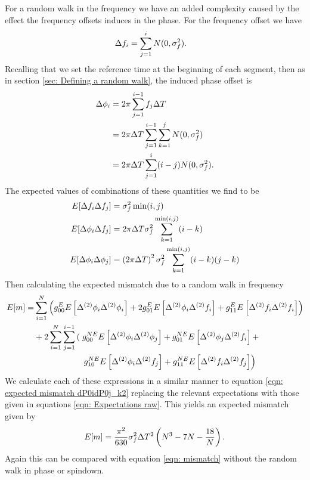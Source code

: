 For a random walk in the frequency we have an added complexity caused by the
effect the frequency offsets induces in the phase. For the frequency offset we 
have
\begin{align}
\Delta f_{i} &= \sum_{j=1}^{i}N(0, \sigma_{f}^{2}).
\end{align}
Recalling that we set the reference time at the beginning of each segment, 
then as in section \ref{sec: Defining a random walk}, the induced phase offset is
\begin{align}
\Delta\phi_{i} &=2\pi \sum_{j=1}^{i-1}f_{j}\Delta T \\
 & = 2\pi\Delta T \sum_{j=1}^{i-1}\sum_{k=1}^{j}N(0, \sigma_{f}^{2}) \\
& = 2\pi\Delta T \sum_{j=1}^{i}(i-j)N(0, \sigma_{f}^{2}).
\end{align}
The expected values of combinations of these quantities we find to be
\begin{align}
E[\Delta f_{i}\Delta f_{j}] & = \sigma_{f}^{2} \min(i, j) \\
E[\Delta\phi_{i}\Delta f_{j}] & = 2 \pi \Delta T \sigma_{f}^{2} \sum_{k=1}^{\min(i, j)}(i-k)\\
E[\Delta\phi_{i}\Delta\phi_{j}] & = 
\left(2\pi\Delta T\right)^{2}\sigma_{f}^{2} \sum_{k=1}^{\min(i, j)}(i-k)(j-k)
\label{eqn: Expectations raw}
\end{align}
Then calculating the expected mismatch due to a random walk in frequency 
\begin{align}
E[m] = & 
\s{i=1}{N}\left(g_{00}^{E}E\left[\Delta^{(2)}\phi_{i}\Delta^{(2)}\phi_{i}\right] 
+ 2 g_{01}^{E}E\left[\Delta^{(2)}\phi_{i}\Delta^{(2)}\f_{i}\right] 
+  g_{11}^{E} E\left[\Delta^{(2)}\f_{i}\Delta^{(2)}\f_{i}\right] \right) \\
& + 2\s{i=1}{N}\s{j=1}{i-1}\left(\right.
g_{00}^{NE}E\left[\Delta^{(2)}\phi_{i}\Delta^{(2)}\phi_{j}\right] + 
g_{01}^{NE}E\left[\Delta^{(2)}\phi_{j}\Delta^{(2)}\f_{i}\right] +  \\ 
&\hspace{20mm}\left. g_{10}^{NE}E\left[\Delta^{(2)}\phi_{i}\Delta^{(2)}\f_{j}\right] + 
g_{11}^{NE} E\left[\Delta^{(2)}\f_{i}\Delta^{(2)}\f_{j}\right] \right)
\end{align}
We calculate each of these expressions in a similar manner to equation
\eqref{eqn: expected mismatch dP0idP0j_k2} replacing the relevant expectations
with those given in equations \eqref{eqn: Expectations raw}. This yields an
expected mismatch given by 
\begin{equation}
E[m] = \frac{\pi^{2} }{630} \sigma_{f}^{2} \Delta T^{2}  \left(N^{3} - 7N- \frac{18}{N} \right).
\label{eqn: Expected mismatch RW in frequency k2}
\end{equation}
Again this can be compared with equation \eqref{eqn: mismatch} without the 
random walk in phase or spindown. 
